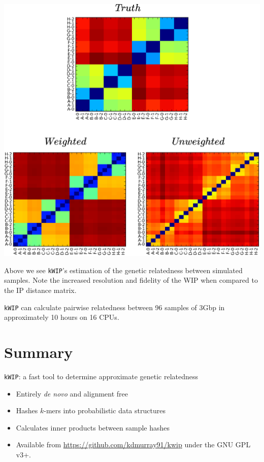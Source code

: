 \documentclass[a0,portrait]{a0poster}
\begin{document}
\begin{multicols}{2}
\begin{center}
  \includegraphics[width=30cm]{mats.png}
  \vspace{1cm}
\end{center}

Above we see \texttt{kWIP}'s estimation of the genetic relatedness between
simulated samples. Note the increased resolution and fidelity of the WIP when
compared to the IP distance matrix.

\texttt{kWIP} can calculate pairwise relatedness between 96 samples of 3Gbp in
approximately 10 hours on 16 CPUs.




\section*{Summary}
\texttt{kWIP}: a fast tool to determine approximate genetic relatedness
\begin{itemize}
  \item Entirely \textit{de novo} and alignment free
  \item Hashes $k$-mers into probabilistic data structures
  \item Calculates inner products between sample hashes
  \item Available from \url{https://github.com/kdmurray91/kwip} under the GNU GPL v3+.
\end{itemize}


\end{multicols}
\end{document}
